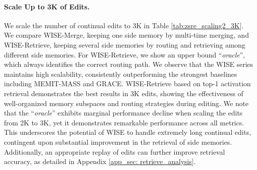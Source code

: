 \documentclass{article}
\begin{document}
\paragraph{Scale Up to 3K of Edits.} \label{subsec: scaling2_3K}
We scale the number of continual edits to 3K in Table \ref{tab:zsre_scaling2_3K}. 
We compare WISE-Merge, keeping one side memory by multi-time merging, and WISE-Retrieve, keeping several side memories by routing and retrieving among different side memories.  
For WISE-Retrieve, we show an upper bound ``\textit{oracle}'', which always identifies the correct routing path. 
We observe that the WISE series maintains high scalability, consistently outperforming the strongest baselines including MEMIT-MASS and GRACE.
WISE-Retrieve based on top-1 activation retrieval demonstrates the best results in 3K edits, showing the effectiveness of well-organized memory subspaces and routing strategies during editing.
We note that the ``\textit{oracle}'' exhibits marginal performance decline when scaling the edits from 2K to 3K, yet it demonstrates remarkable performance across all metrics. 
This underscores the potential of WISE to handle extremely long continual edits, contingent upon substantial improvement in the retrieval of side memories. 
Additionally, an appropriate replay of edits can further improve retrieval accuracy, as detailed in Appendix \ref{app_sec: retrieve_analysis}.


\begin{table}
    \centering
    \vspace{-0.47cm}
    \caption{\textbf{Ablation study of Router (compared with Table \ref{tab:zsre_main_editing})}. \texttt{LlaMA}.}
    \centering
    \label{tab:router_ablation}
    \vspace{-0.4cm}
\end{table}
\end{document}
